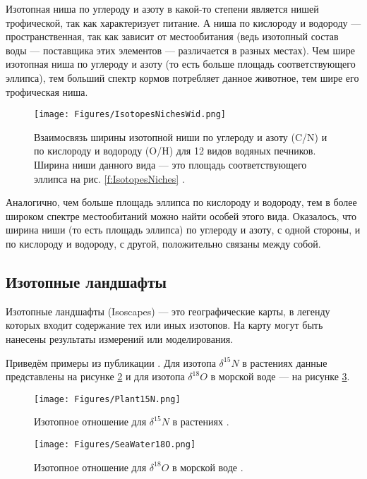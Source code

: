 \documentclass[a5paper,openany]{book}
\begin{document}
Изотопная ниша по углероду и азоту в какой-то степени является нишей трофической, так как характеризует питание. А ниша по кислороду и водороду — пространственная, так как зависит от местообитания (ведь изотопный состав воды — поставщика этих элементов — различается в разных местах). Чем шире изотопная ниша по углероду и азоту (то есть больше площадь соответствующего эллипса), тем больший спектр кормов потребляет данное животное, тем шире его трофическая ниша. 

\begin{figure}[ht] 
	\centering\small
	\unitlength=1mm
	{\texttt{[image: Figures/IsotopesNichesWid.png]}} 
	\caption{Взаимосвязь ширины изотопной ниши по углероду и азоту (C/N) и по кислороду и водороду (O/H) для 12 видов водяных печников. Ширина ниши данного вида — это площадь соответствующего эллипса на рис. \ref{f:IsotopesNiches} \cite{Rader2017}.} 
	\label{f:IsotopesNichesWid}
\end{figure}

Аналогично, чем больше площадь эллипса по кислороду и водороду, тем в более широком спектре местообитаний можно найти особей этого вида. Оказалось, что ширина ниши (то есть площадь эллипса) по углероду и азоту, с одной стороны, и по кислороду и водороду, с другой, положительно связаны между собой.


\subsection{ Изотопные ландшафты }\label{s:IsoScapes}

Изотопные ландшафты (Isoscapes) --- это географические карты, в легенду которых входит содержание тех или иных изотопов. На карту могут быть нанесены результаты измерений или моделирования. 

Приведём примеры из публикации \cite{Bowen2010}. Для изотопа  $\delta^{15}N$ в растениях данные представлены на рисунке \ref{f:Plant15N} и для изотопа  $\delta^{18}O$ в морской воде --- на рисунке \ref{f:SeaWater18O}.
\begin{figure}[ht] 
	\centering\small
	\unitlength=1mm
	{\texttt{[image: Figures/Plant15N.png]}} 
	\caption{Изотопное отношение для $\delta^{15}N$ в растениях \cite{Bowen2010}.} 
	\label{f:Plant15N}
\end{figure}


\begin{figure}[ht] 
	\centering\small
	\unitlength=1mm
	{\texttt{[image: Figures/SeaWater18O.png]}} 
	\caption{Изотопное отношение для  $\delta^{18}O$ в морской воде \cite{Bowen2010}.} 
	\label{f:SeaWater18O}
\end{figure}
\end{document}

